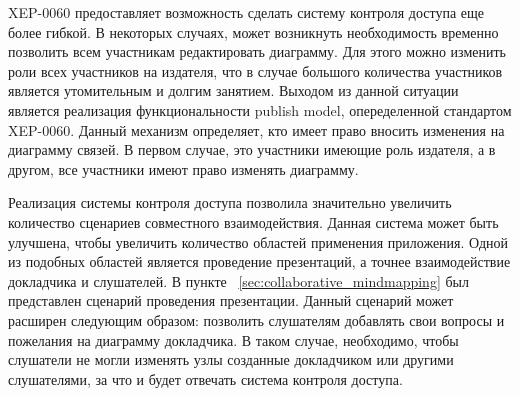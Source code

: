 XEP-0060 предоставляет возможность сделать систему контроля доступа еще более 
гибкой. В некоторых случаях, может возникнуть необходимость временно 
позволить всем участникам  редактировать диаграмму. Для этого можно изменить 
роли всех участников на издателя, что в случае большого количества участников 
является утомительным и долгим занятием. Выходом из данной ситуации является 
реализация функциональности publish model, опеределенной стандартом XEP-0060. 
Данный механизм определяет, кто имеет право вносить изменения на диаграмму 
связей. В первом случае, это участники имеющие роль издателя, а в другом, все 
участники имеют право изменять диаграмму.

Реализация системы контроля доступа позволила значительно увеличить 
количество сценариев совместного взаимодействия. Данная система может быть 
улучшена, чтобы увеличить количество областей применения приложения. Одной из 
подобных областей является проведение презентаций, а точнее взаимодействие 
докладчика и слушателей. В пункте ~\ref{sec:collaborative_mindmapping} был 
представлен сценарий проведения презентации. Данный сценарий может расширен 
следующим образом: позволить слушателям добавлять свои вопросы и пожелания на 
диаграмму докладчика. В таком случае, необходимо, чтобы слушатели не могли 
изменять узлы созданные докладчиком или другими слушателями, за что и будет 
отвечать система контроля доступа.  
